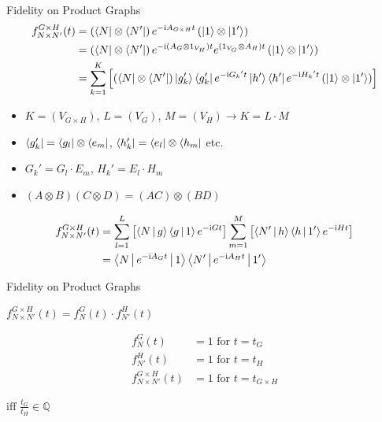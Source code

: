 \documentclass{beamer}
\begin{document}
\begin{frame}{Fidelity on Product Graphs}
	\begin{align*}
		f^{G\times H}_{N\times N'}(t) &= \left( \bra{N} \otimes \bra{N'} \right)e^{-\text{i}A_{G\times H}t} \left( \ket{1} \otimes \ket{1'} \right) \\
		&= \left( \bra{N} \otimes \bra{N'} \right)e^{-\text{i}(A_G \otimes \text{1}_{V_H})t} e^{(\text{1}_{V_G} \otimes A_H)t} \left( \ket{1} \otimes \ket{1'} \right) \\
		&= \sum_{k=1}^{K}\left[ \left( \bra{N} \otimes \bra{N'} \right) \ket{g'_k}\bra{g'_k}e^{-\text{i}G_k{}'t} \ket{h'}\bra{h'}e^{-\text{i}H_k{}'t} \left( \ket{1} \otimes \ket{1'} \right) \right]
	\end{align*}
	\begin{itemize}
		\item $K = (V_{G\times H})$, $L = (V_G)$, $M = (V_H) \rightarrow K = L\cdot M$
		\item $\bra{g'_k} = \bra{g_l} \otimes \bra{e_m}$, $\bra{h'_k} = \bra{e_l} \otimes \bra{h_m}$ etc.
		\item $G_k{}' = G_l\cdot E_m$, $H_k{}' = E_l\cdot H_m$
		\item $(A\otimes B)(C\otimes D) = (AC)\otimes (BD)$
	\end{itemize}
	\begin{align*}
		f^{G\times H}_{N\times N'}(t) &= \sum_{l=1}^L\left[ \Braket{N|g}\Braket{g|1}e^{-\text{i}Gt} \right] \sum_{m=1}^M\left[ \Braket{N'|h}\Braket{h|1'}e^{-\text{i}Ht} \right] \\
		&= \Braket{N|e^{-\text{i}A_G t}|1}\Braket{N'|e^{-\text{i}A_H t}|1'}
	\end{align*}
\end{frame}

\begin{frame}[t]{Fidelity on Product Graphs}
	\begin{exampleblock}{}
	\setlength\abovedisplayskip{-8pt}
	\begin{center}
		$ f^{G\times H}_{N\times N'}(t) = f^G_N(t)\cdot f^H_{N'}(t) $
	\end{center}
	\end{exampleblock}
	\begin{align*}
		f^G_N(t) &= 1 \text{ for } t = t_G \\ 
		f^H_{N'}(t) &= 1 \text{ for } t = t_H \\ 
		f^{G\times H}_{N\times N'}(t) &= 1 \text{ for } t = t_{G\times H}
	\end{align*}
	\begin{exampleblock}{}
	\setlength\abovedisplayskip{-8pt}
	\begin{center}
		$ \text{iff }\frac{t_G}{t_H} \in \mathbb{Q}$ %
	\end{center}
	\end{exampleblock}
\end{frame}
\end{document}

